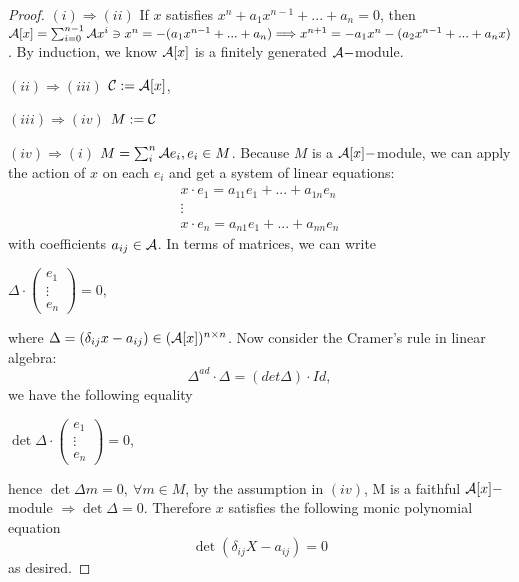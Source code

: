 \documentclass[11pt]{article}
\newcommand{\cala}{{\cal A}}
\newcommand{\calc}{{\cal C}}
\newcommand{\Lrta}{\Longrightarrow}
\begin{document}
\begin{proof}
$(i)\Lrta(ii)$ If $x$ satisfies $x^n+a_1 x^{n-1}+...+a_n=0$, then $\cala[x]=\sum^{n-1}_{i=0}\cala x^i\ni x^n=-(a_1 x^{n-1}+...+a_n)\Lrta x^{n+1}=-a_1x^n-(a_2 x^{n-1}+...+a_n x)$. By induction, we know $\cala[x]$ is a finitely generated $\cala-$module.

$(ii)\Lrta (iii)$ $\calc:=\cala[x]$,

$(iii)\Lrta(iv)$ $M:=\calc$

$(iv)\Lrta(i)$ $M=\sum_i^n\cala e_i, e_i\in M$. Because $M$ is a $\cala[x]-$module, we can apply the action of $x$ on each $e_i$ and get a system of linear equations:
$$
\begin{array}{ c }
x\cdot e_{1} =a_{11} e_{1} +...+a_{1n} e_{n}\\
\vdots \\
x\cdot e_{n} =a_{n1} e_{1} +...+a_{nn} e_{n}
\end{array}
$$
with coefficients $a_{ij}\in\cala$. In terms of matrices, we can write
\begin{center}
$\Delta \cdot \begin{pmatrix}
e_{1}\\
\vdots \\
e_{n}
\end{pmatrix} =0$,
\end{center}
where $\Delta=(\delta_{ij}x-a_{ij})\in (\cala[x])^{n\times n}$. Now consider the Cramer's rule in linear algebra:
$$
\Delta^{ad}\cdot \Delta=(det\Delta)\cdot Id,
$$
we have the following equality
\begin{center}
$\det \Delta \cdot \begin{pmatrix}
e_{1}\\
\vdots \\
e_{n}
\end{pmatrix} =0$,
\end{center}
hence $\det\Delta m=0,\ \forall m\in M$, by the assumption in $(iv)$, M is a faithful $\cala[x]-$module $\Lrta \det \Delta=0$. Therefore $x$ satisfies the following monic polynomial equation 
$$
\det (\delta_{ij} X-a_{ij})=0
$$
as desired.
\end{proof}
\end{document}
